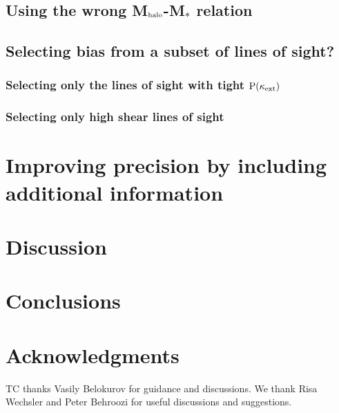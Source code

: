 \documentclass[useAMS,usenatbib]{mn2e}
\begin{document}
\subsection{Using the wrong M$_{\rm halo}$-M$_{*}$ relation}
\subsection{Selecting bias from a subset of lines of sight?}
\subsubsection{Selecting only the lines of sight with tight ${\rm P}(\kappa_{\rm ext})$}
\subsubsection{Selecting only high shear lines of sight}


\section{Improving precision by including additional information}

\section{Discussion}
\label{sec:discuss}


\section{Conclusions}
\label{sec:conclude}


\section*{Acknowledgments}
 
TC thanks Vasily Belokurov for guidance and discussions.
We thank Risa Wechsler and Peter Behroozi for useful discussions and 
suggestions.

\end{document}
